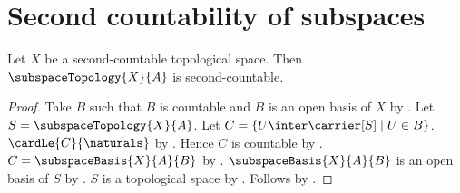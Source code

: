 \section{Second countability of subspaces}




\begin{theorem}\label{subspace_of_second_countable_space}
    Let $X$ be a second-countable topological space.
    Then $\subspaceTopology{X}{A}$ is second-countable.
\end{theorem}
\begin{proof}
    Take $B$ such that $B$ is countable and $B$ is an open basis of $X$
        by .
    Let $S=\subspaceTopology{X}{A}$.
    Let $C=\{U\inter\carrier[S]\mid U\in B\}$.
    $\cardLe{C}{\naturals}$ by .
    Hence $C$ is countable by .
    $C=\subspaceBasis{X}{A}{B}$ by .
    $\subspaceBasis{X}{A}{B}$ is an open basis of $S$ by
        .
    $S$ is a topological space by .
    Follows by .
\end{proof}
